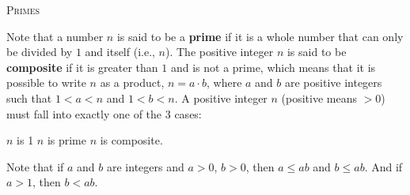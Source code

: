 \textsc{Primes}

Note that a number $n$ is said to be a \textbf{prime} if it is a whole number
that can only be divided by $1$ and itself
(i.e., $n$).
The positive integer $n$ is said to be \textbf{composite} if it is
greater than $1$ and is not a prime, which means
that it is possible to write $n$ as a product, $n = a \cdot b$,
where $a$ and $b$ are positive integers such that
$1 < a < n$ and $1 < b < n$.
A positive integer $n$ (positive means $> 0$) must fall into exactly
one of the 3 cases:
\begin{tightlist}
  \li $n$ is 1
  \li $n$ is prime
  \li $n$ is composite.
\end{tightlist}

Note that if $a$ and $b$ are integers and $a > 0$, $b > 0$,
then $a \leq ab$ and $b \leq ab$.
And if $a > 1$, then $b < ab$.

